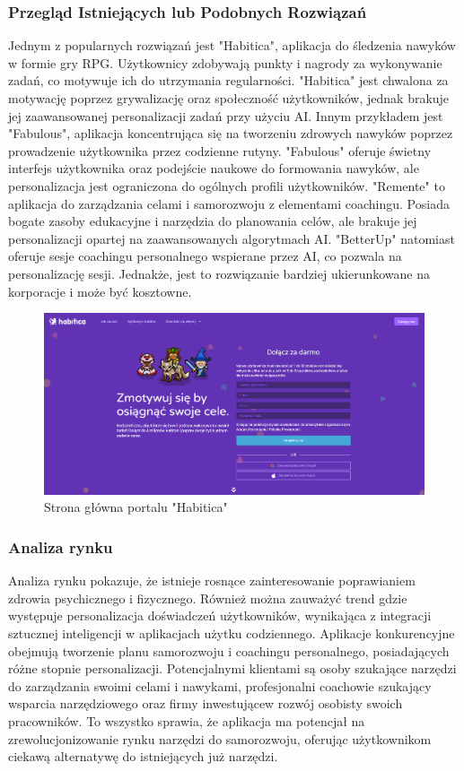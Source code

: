 \subsubsection{Przegląd Istniejących lub Podobnych Rozwiązań}
Jednym z popularnych rozwiązań jest "Habitica", aplikacja do śledzenia nawyków w formie gry RPG. Użytkownicy zdobywają punkty i nagrody za wykonywanie zadań, co motywuje ich do utrzymania regularności. "Habitica" jest chwalona za motywację poprzez grywalizację oraz społeczność użytkowników, jednak brakuje jej zaawansowanej personalizacji zadań przy użyciu AI.
Innym przykładem jest "Fabulous", aplikacja koncentrująca się na tworzeniu zdrowych nawyków poprzez prowadzenie użytkownika przez codzienne rutyny. "Fabulous" oferuje świetny interfejs użytkownika oraz podejście naukowe do formowania nawyków, ale personalizacja jest ograniczona do ogólnych profili użytkowników.
"Remente" to aplikacja do zarządzania celami i samorozwoju z elementami coachingu. Posiada bogate zasoby edukacyjne i narzędzia do planowania celów, ale brakuje jej personalizacji opartej na zaawansowanych algorytmach AI. "BetterUp" natomiast oferuje sesje coachingu personalnego wspierane przez AI, co pozwala na personalizację sesji. Jednakże, jest to rozwiązanie bardziej ukierunkowane na korporacje i może być kosztowne.

\begin{figure}[H]
    \centering
    \includegraphics[width=1\linewidth]{Obrazy/habitcaSignIn.png}
    \caption{Strona główna portalu "Habitica"}
    \label{fig:enter-label}
\end{figure}

\subsubsection{Analiza rynku}
Analiza rynku pokazuje, że istnieje rosnące zainteresowanie poprawianiem zdrowia psychicznego i fizycznego. Również można zauważyć trend gdzie występuje personalizacja doświadczeń użytkowników, wynikająca z integracji sztucznej inteligencji w aplikacjach użytku codziennego. Aplikacje konkurencyjne obejmują tworzenie planu samorozwoju i coachingu personalnego, posiadających różne stopnie personalizacji. Potencjalnymi klientami są osoby szukające narzędzi do zarządzania swoimi celami i nawykami, profesjonalni coachowie szukający wsparcia narzędziowego oraz firmy inwestujące\linebreak w rozwój osobisty swoich pracowników.
To wszystko sprawia, że aplikacja ma potencjał na zrewolucjonizowanie rynku narzędzi do samorozwoju, oferując użytkownikom ciekawą alternatywę do istniejących już narzędzi.

